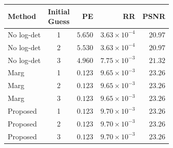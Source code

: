 \begin{tabular}{@{}lcrrr@{}}
\toprule
Method & \shortstack{\small Initial\\Guess} & PE & RR & PSNR \\
\midrule
No log-det & 1 & $5.650$ & $3.63\times10^{-4}$ & $20.97$ \\
No log-det & 2 & $5.530$ & $3.63\times10^{-4}$ & $20.97$ \\
No log-det & 3 & $4.960$ & $7.75\times10^{-3}$ & $21.32$ \\
\addlinespace[3pt]
Marg & 1 & $\mathbf{0.123}$ & $9.65\times10^{-3}$ & $\mathbf{23.26}$ \\
Marg & 2 & $\mathbf{0.123}$ & $9.65\times10^{-3}$ & $\mathbf{23.26}$ \\
Marg & 3 & $\mathbf{0.123}$ & $9.65\times10^{-3}$ & $\mathbf{23.26}$ \\
\addlinespace[3pt]
Proposed & 1 & $\mathbf{0.123}$ & $9.70\times10^{-3}$ & $\mathbf{23.26}$ \\
Proposed & 2 & $\mathbf{0.123}$ & $9.70\times10^{-3}$ & $\mathbf{23.26}$ \\
Proposed & 3 & $\mathbf{0.123}$ & $9.70\times10^{-3}$ & $\mathbf{23.26}$ \\
\bottomrule
\end{tabular}
